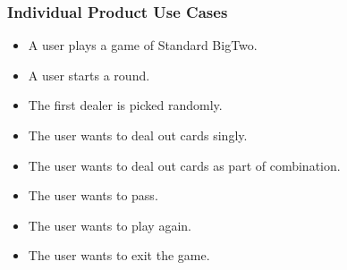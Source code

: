 \documentclass[12pt, titlepage]{article}
\begin{document}
\subsubsection{Individual Product Use Cases}
\begin{itemize}
    \item  A user plays a game of Standard BigTwo.
    \item A user starts a round.
    \item The first dealer is picked randomly.
    \item The user wants to deal out cards singly.
    \item The user wants to deal out cards as part of combination.
    \item The user wants to pass.
    \item The user wants to play again.
    \item The user wants to exit the game.
    
\end{itemize}
\FloatBarrier
\end{document}
